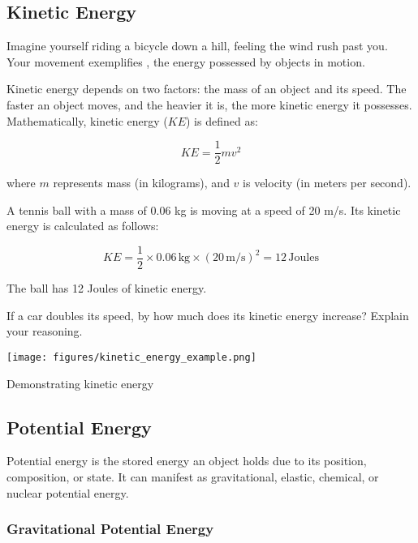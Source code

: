 \subsection{Kinetic Energy}

Imagine yourself riding a bicycle down a hill, feeling the wind rush past you. Your movement exemplifies , the energy possessed by objects in motion.

Kinetic energy depends on two factors: the mass of an object and its speed. The faster an object moves, and the heavier it is, the more kinetic energy it possesses. Mathematically, kinetic energy ($KE$) is defined as:

\[
KE = \frac{1}{2}mv^2
\]

where $m$ represents mass (in kilograms), and $v$ is velocity (in meters per second).


\begin{example}
A tennis ball with a mass of 0.06 kg is moving at a speed of 20 m/s. Its kinetic energy is calculated as follows:

\[
KE = \frac{1}{2} \times 0.06\,\text{kg} \times (20\,\text{m/s})^2 = 12\,\text{Joules}
\]

The ball has 12 Joules of kinetic energy.
\end{example}

\begin{stopandthink}
If a car doubles its speed, by how much does its kinetic energy increase? Explain your reasoning.
\end{stopandthink}

\begin{marginfigure}
\centering
\texttt{[image: figures/kinetic\_energy\_example.png]}
\caption{Demonstrating kinetic energy}
\end{marginfigure}

\subsection{Potential Energy}

Potential energy is the stored energy an object holds due to its position, composition, or state. It can manifest as gravitational, elastic, chemical, or nuclear potential energy.

\subsubsection{Gravitational Potential Energy}

